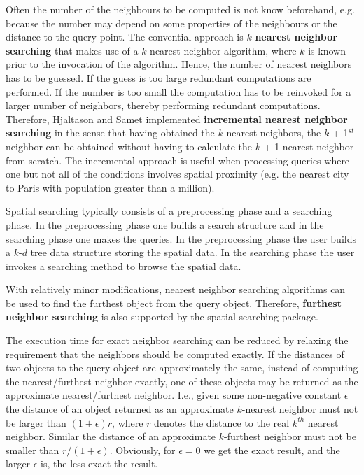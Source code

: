 Often the number of the neighbours to be computed is not know beforehand, e.g. because the number
may depend on some properties of the neighbours or the distance to the query point.
The convential approach is $k$-{\bf nearest neighbor searching} that makes use of a $k$-nearest neighbor
algorithm, where $k$ is known prior to the invocation of the algorithm.
Hence, the number of nearest neighbors has to be
guessed. If the guess is too large redundant computations are performed.
If the number is too small the computation has to be  
reinvoked for a larger number of neighbors, thereby performing redundant computations.
Therefore, Hjaltason and Samet \cite{hs-rsd-95} implemented {\bf incremental nearest neighbor searching} in the sense that having obtained
the $k$ nearest neighbors, the $k$ + 1$^{st}$ neighbor can be obtained without
having to calculate the $k$ + 1 nearest neighbor from scratch.
The incremental approach is useful when processing queries where
one but not all of the conditions involves spatial proximity (e.g. the nearest city to Paris with
population greater than a million).

Spatial searching typically consists of a preprocessing phase and a searching phase. 
In the preprocessing phase one builds a search structure 
and in the searching phase 
one makes the queries. 
In the preprocessing phase the user builds a $k$-$d$ tree data structure storing the spatial data.
In the searching phase the user invokes a searching method to browse the spatial data.

With relatively minor modifications, nearest neighbor searching algorithms can be
used to find the furthest object from the query object. 
Therefore, {\bf furthest neighbor searching} is also supported
by the spatial searching package.

The execution time for exact neighbor searching can be reduced by relaxing
the requirement that the neighbors should be computed exactly.
If the distances of two objects to the query object are approximately the same,
instead of computing the nearest/furthest neighbor exactly, one of these objects may
be returned as the approximate nearest/furthest neighbor. I.e., given some non-negative constant
$\epsilon$ the distance of an object returned as an approximate $k$-nearest neighbor
must not be larger than $(1+\epsilon)r$, where
$r$ denotes the distance to the real $k^{th}$ nearest neighbor.
Similar the distance of an approximate $k$-furthest neighbor must not be smaller than $r/(1+\epsilon)$. 
Obviously, for $\epsilon=0$ we get the exact result, and the larger $\epsilon$ is, the less exact the result.

